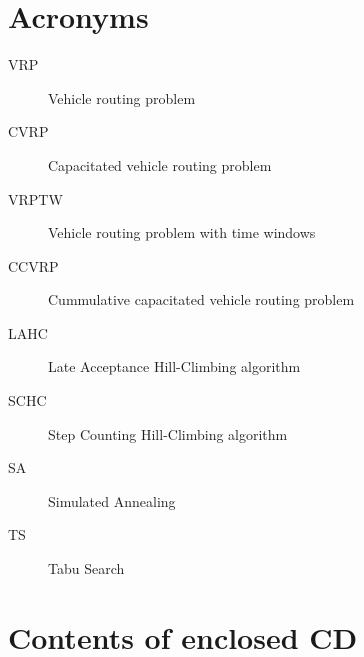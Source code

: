 \documentclass[thesis=B,english]{FITthesis}[2012/10/20]
\begin{document}



\appendix

\chapter{Acronyms}
\begin{description}
    \item[VRP] Vehicle routing problem
    \item[CVRP] Capacitated vehicle routing problem
    \item[VRPTW] Vehicle routing problem with time windows
    \item[CCVRP] Cummulative capacitated vehicle routing problem
    \item[LAHC] Late Acceptance Hill-Climbing algorithm
    \item[SCHC] Step Counting Hill-Climbing algorithm
    \item[SA] Simulated Annealing
    \item[TS] Tabu Search
\end{description}

\chapter{Contents of enclosed CD}


\begin{figure}
\end{figure}
\end{document}
